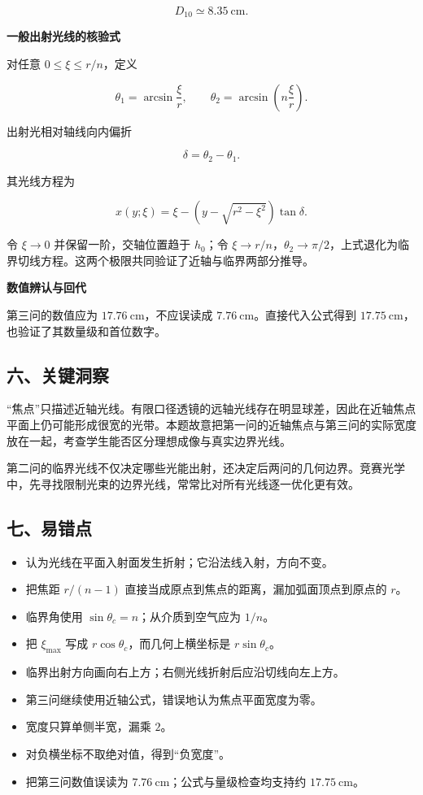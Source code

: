 \documentclass[12pt,a4paper,UTF8]{ctexart}
\newcommand{\tightlist}{\setlength{\itemsep}{0pt}\setlength{\parskip}{0pt}}
\begin{document}
\[\boxed{D_{10}\simeq8.35\ \mathrm{cm}}.\]

\textbf{一般出射光线的核验式}

对任意 \(0\le\xi\le r/n\)，定义

\[
\theta_1=\arcsin\frac\xi r,
\qquad
\theta_2=\arcsin\left(n\frac\xi r\right).
\]

出射光相对轴线向内偏折

\[\delta=\theta_2-\theta_1.\]

其光线方程为

\[
x(y;\xi)=\xi-
\left(y-\sqrt{r^2-\xi^2}\right)\tan\delta.
\]

令 \(\xi\to0\) 并保留一阶，交轴位置趋于 \(h_0\)；令
\(\xi\to r/n\)，\(\theta_2\to\pi/2\)，上式退化为临界切线方程。这两个极限共同验证了近轴与临界两部分推导。

\textbf{数值辨认与回代}

第三问的数值应为 \(17.76\ \mathrm{cm}\)，不应误读成
\(7.76\ \mathrm{cm}\)。直接代入公式得到
\(17.75\ \mathrm{cm}\)，也验证了其数量级和首位数字。

\subsection{六、关键洞察}\label{ux516dux5173ux952eux6d1eux5bdf-6}

``焦点''只描述近轴光线。有限口径透镜的远轴光线存在明显球差，因此在近轴焦点平面上仍可能形成很宽的光带。本题故意把第一问的近轴焦点与第三问的实际宽度放在一起，考查学生能否区分理想成像与真实边界光线。

第二问的临界光线不仅决定哪些光能出射，还决定后两问的几何边界。竞赛光学中，先寻找限制光束的边界光线，常常比对所有光线逐一优化更有效。

\subsection{七、易错点}\label{ux4e03ux6613ux9519ux70b9-6}

\begin{itemize}
\tightlist
\item
  认为光线在平面入射面发生折射；它沿法线入射，方向不变。
\item
  把焦距 \(r/(n-1)\) 直接当成原点到焦点的距离，漏加弧面顶点到原点的
  \(r\)。
\item
  临界角使用 \(\sin\theta_c=n\)；从介质到空气应为 \(1/n\)。
\item
  把 \(\xi_{\max}\) 写成 \(r\cos\theta_c\)，而几何上横坐标是
  \(r\sin\theta_c\)。
\item
  临界出射方向画向右上方；右侧光线折射后应沿切线向左上方。
\item
  第三问继续使用近轴公式，错误地认为焦点平面宽度为零。
\item
  宽度只算单侧半宽，漏乘 \(2\)。
\item
  对负横坐标不取绝对值，得到``负宽度''。
\item
  把第三问数值误读为 \(7.76\ \mathrm{cm}\)；公式与量级检查均支持约
  \(17.75\ \mathrm{cm}\)。
\end{itemize}
\end{document}
